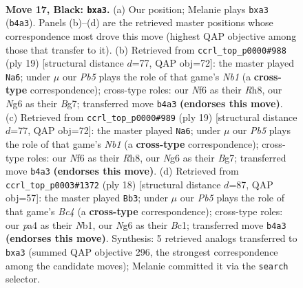\documentclass[11pt]{article}
\begin{document}
\clearpage

\begin{figure}[p]\centering
\begin{subfigure}{0.46\textwidth}\centering
\resizebox{\linewidth}{!}{%
\newchessgame
\chessboard[
  setfen={r1r3k1/1Np1bppp/p2p1nn1/7b/PpP1PP2/1B6/1P4P1/RNB1R1K1 b - a3 0 17},
  showmover=false,
  pgfstyle=straightmove, color=movearrow, markmove={b4-a3}
]}
\caption{}
\end{subfigure}\hfill
\begin{subfigure}{0.46\textwidth}\centering
\resizebox{\linewidth}{!}{%
\newchessgame
\chessboard[
  setfen={rnb1k2r/p1pnp1bp/1p4p1/1N2Pp2/2P2P2/8/PP4PP/R1BK1BNR b kq - 1 10},
  showmover=false,
  pgfstyle=straightmove, color=movearrow, markmove={b8-a6}
]}
\caption{}
\end{subfigure}
\\[4pt]
\begin{subfigure}{0.46\textwidth}\centering
\resizebox{\linewidth}{!}{%
\newchessgame
\chessboard[
  setfen={rnb1k2r/p1pnp1bp/1p4p1/1N2Pp2/2P2P2/8/PP4PP/R1BK1BNR b kq - 1 10},
  showmover=false,
  pgfstyle=straightmove, color=movearrow, markmove={b8-a6}
]}
\caption{}
\end{subfigure}\hfill
\begin{subfigure}{0.46\textwidth}\centering
\resizebox{\linewidth}{!}{%
\newchessgame
\chessboard[
  setfen={rnb4r/ppp1kp2/3b1n1p/3P2p1/2BP1p2/5N2/PPP3PP/RNB2RK1 w - - 0 10},
  showmover=false,
  pgfstyle=straightmove, color=movearrow, markmove={c4-b3}
]}
\caption{}
\end{subfigure}
\caption{\textbf{Move 17, Black: \texttt{bxa3}.} (a) Our position; Melanie plays \texttt{bxa3} (\texttt{b4a3}). Panels (b)--(d) are the retrieved master positions whose correspondence most drove this move (highest QAP objective among those that transfer to it). (b) Retrieved from \texttt{ccrl\_top\_p0000\#988} (ply 19) [structural distance $d$=77, QAP obj=72]: the master played \texttt{Na6}; under $\mu$ our \emph{Pb5} plays the role of that game's \emph{Nb1} (a \textbf{cross-type} correspondence); cross-type roles: our \emph{N}f6 as their \emph{R}h8, our \emph{N}g6 as their \emph{B}g7; transferred move \texttt{b4a3} \textbf{(endorses this move)}. (c) Retrieved from \texttt{ccrl\_top\_p0000\#989} (ply 19) [structural distance $d$=77, QAP obj=72]: the master played \texttt{Na6}; under $\mu$ our \emph{Pb5} plays the role of that game's \emph{Nb1} (a \textbf{cross-type} correspondence); cross-type roles: our \emph{N}f6 as their \emph{R}h8, our \emph{N}g6 as their \emph{B}g7; transferred move \texttt{b4a3} \textbf{(endorses this move)}. (d) Retrieved from \texttt{ccrl\_top\_p0003\#1372} (ply 18) [structural distance $d$=87, QAP obj=57]: the master played \texttt{Bb3}; under $\mu$ our \emph{Pb5} plays the role of that game's \emph{Bc4} (a \textbf{cross-type} correspondence); cross-type roles: our \emph{p}a4 as their \emph{N}b1, our \emph{N}g6 as their \emph{B}c1; transferred move \texttt{b4a3} \textbf{(endorses this move)}. Synthesis: 5 retrieved analogs transferred to \texttt{bxa3} (summed QAP objective 296, the strongest correspondence among the candidate moves); Melanie committed it via the \texttt{search} selector.}
\label{fig:thought-m33}
\end{figure}
\end{document}
